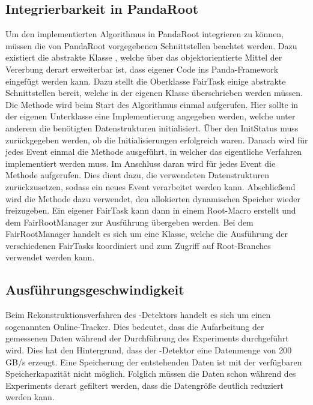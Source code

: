 \subsection{Integrierbarkeit in PandaRoot}
Um den implementierten Algorithmus in PandaRoot integrieren zu können, müssen die von PandaRoot vorgegebenen Schnittstellen beachtet werden. Dazu existiert die abstrakte Klasse , welche über das objektorientierte Mittel der Vererbung derart erweiterbar ist, dass eigener Code ins Panda-Framework eingefügt werden kann. Dazu stellt die Oberklasse FairTask einige abstrakte Schnittstellen bereit, welche in der eigenen Klasse überschrieben werden müssen. Die Methode  wird beim Start des Algorithmus einmal aufgerufen. Hier sollte in der eigenen Unterklasse eine Implementierung angegeben werden, welche unter anderem die benötigten Datenstrukturen initialisiert. Über den InitStatus muss zurückgegeben werden, ob die Initialisierungen erfolgreich waren. Danach wird für jedes Event einmal die Methode  ausgeführt, in welcher das eigentliche Verfahren implementiert werden muss. Im Anschluss daran wird für jedes Event die Methode  aufgerufen. Dies dient dazu, die verwendeten Datenstrukturen zurückzusetzen, sodass ein neues Event verarbeitet werden kann. Abschließend wird die Methode  dazu verwendet, den allokierten dynamischen Speicher wieder freizugeben. Ein eigener FairTask kann dann in einem Root-Macro erstellt und dem FairRootManager zur Ausführung übergeben werden. Bei dem FairRootManager handelt es sich um eine Klasse, welche die Ausführung der verschiedenen FairTasks koordiniert und zum Zugriff auf Root-Branches verwendet werden kann.

\subsection{Ausführungsgeschwindigkeit}
Beim Rekonstruktionsverfahren des \pnd{}-Detektors handelt es sich um einen sogenannten Online-Tracker. Dies bedeutet, dass die Aufarbeitung der gemessenen Daten während der Durchführung des Experiments durchgeführt wird. Dies hat den Hintergrund, dass der \pnd{}-Detektor eine Datenmenge von 200
GB/s erzeugt. Eine Speicherung der entstehenden Daten ist mit der verfügbaren Speicherkapazität nicht möglich. Folglich müssen die Daten schon während des Experiments derart gefiltert werden, dass die Datengröße deutlich reduziert werden kann.

